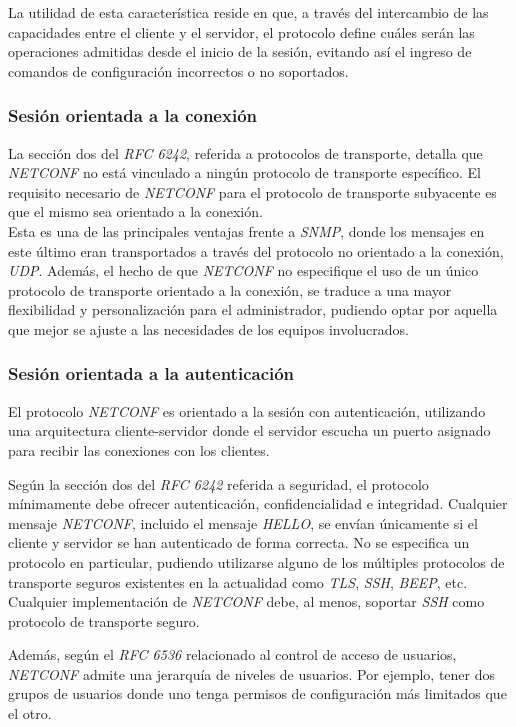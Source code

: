   La utilidad de esta característica reside en que, a través del intercambio de las capacidades entre el cliente y el servidor, el protocolo define cuáles serán las operaciones admitidas desde el inicio de la sesión, evitando así el ingreso de comandos de configuración incorrectos o no soportados. 


  \subsubsection{Sesión orientada a la conexión}
  La sección dos del \textit{RFC 6242}, referida a protocolos de transporte, detalla que \textit{NETCONF} no está vinculado a ningún protocolo de transporte específico. El requisito necesario de \textit{NETCONF} para el protocolo de transporte subyacente es que el mismo sea orientado a la conexión. 
  \\

  Esta es una de las principales ventajas frente a \textit{SNMP}, donde los mensajes en este último eran transportados a través del protocolo no orientado a la conexión, \textit{UDP}. Además, el hecho de que \textit{NETCONF} no especifique el uso de un único protocolo de transporte orientado a la conexión, se traduce a una mayor flexibilidad y personalización para el administrador, pudiendo optar por aquella que mejor se ajuste a las necesidades de los equipos involucrados.


  \subsubsection{Sesión orientada a la autenticación}
  El protocolo \textit{NETCONF} es orientado a la sesión con autenticación, utilizando una arquitectura cliente-servidor donde el servidor escucha un puerto asignado para recibir las conexiones con los clientes. 

  Según la sección dos del \textit{RFC 6242} referida a seguridad, el protocolo mínimamente debe ofrecer autenticación, confidencialidad e integridad. Cualquier mensaje \textit{NETCONF}, incluido el mensaje \textit{HELLO}, se envían únicamente si el cliente y servidor se han autenticado de forma correcta. No se especifica un protocolo en particular, pudiendo utilizarse alguno de los múltiples protocolos de transporte seguros existentes en la actualidad como \textit{TLS}, \textit{SSH}, \textit{BEEP}, etc. Cualquier implementación de \textit{NETCONF} debe, al menos, soportar \textit{SSH} como protocolo de transporte seguro.

  Además, según el \textit{RFC 6536} relacionado al control de acceso de usuarios, \textit{NETCONF} admite una jerarquía de niveles de usuarios. Por ejemplo, tener dos grupos de usuarios donde uno tenga permisos de configuración más limitados que el otro.

